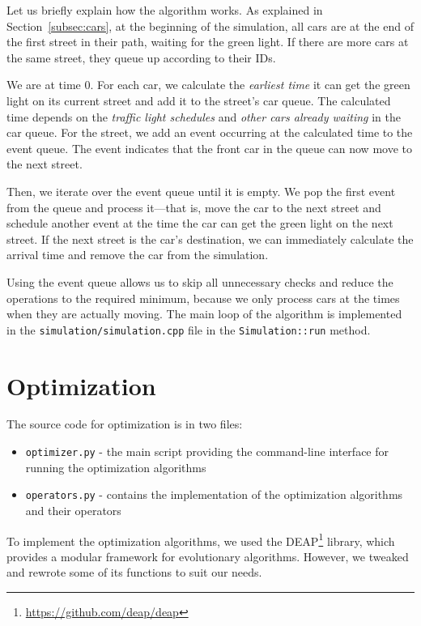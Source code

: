 Let us briefly explain how the algorithm works.
As explained in Section~\ref{subsec:cars}, at the beginning of the simulation, all cars are at the end of the first street in their path, waiting for the green light. If there are more cars at the same street, they queue up according to their IDs.

We are at time $0$. For each car, we calculate the \textit{earliest time} it can get the green light on its current street and add it to the street's car queue.
The calculated time depends on the \textit{traffic light schedules} and \textit{other cars already waiting} in the car queue.
For the street, we add an event occurring at the calculated time to the event queue. The event indicates that the front car in the queue can now move to the next street.

Then, we iterate over the event queue until it is empty. We pop the first event from the queue and process it---that is, move the car to the next street and schedule another event at the time the car can get the green light on the next street. If the next street is the car's destination, we can immediately calculate the arrival time and remove the car from the simulation.

Using the event queue allows us to skip all unnecessary checks and reduce the operations to the required minimum, because we only process cars at the times when they are actually moving.
The main loop of the algorithm is implemented in the \verb|simulation/simulation.cpp| file in the \verb|Simulation::run| method. 

\section{Optimization}

The source code for optimization is in two files:
\begin{itemize}
    \item \verb|optimizer.py| - the main script providing the command-line interface for running the optimization algorithms 
    \item \verb|operators.py| - contains the implementation of the optimization algorithms and their operators
\end{itemize}
To implement the optimization algorithms, we used the DEAP\footnote{\url{https://github.com/deap/deap}} library, which provides a modular framework for evolutionary algorithms. However, we tweaked and rewrote some of its functions to suit our needs.

